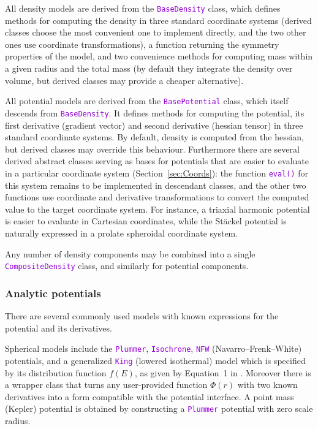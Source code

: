 \documentclass[12pt]{article}
\newcommand{\ttt}[1]{\textcolor{darkviolet}{\texttt{#1}}}
\begin{document}
All density models are derived from the \ttt{BaseDensity} class, which defines methods for computing the density in three standard coordinate systems (derived classes choose the most convenient one to implement directly, and the two other ones use coordinate transformations), a function returning the symmetry properties of the model, and two convenience methods for computing mass within a given radius and the total mass (by default they integrate the density over volume, but derived classes may provide a cheaper alternative).

All potential models are derived from the \ttt{BasePotential} class, which itself descends from \ttt{BaseDensity}. It defines methods for computing the potential, its first derivative (gradient vector) and second derivative (hessian tensor) in three standard coordinate systems. By default, density is computed from the hessian, but derived classes may override this behaviour.
Furthermore there are several derived abstract classes serving as bases for potentials that are easier to evaluate in a particular coordinate system (Section~\ref{sec:Coords}): the function \ttt{eval()} for this system remains to be implemented in descendant classes, and the other two functions use coordinate and derivative transformations to convert the computed value to the target coordinate system.
For instance, a triaxial harmonic potential is easier to evaluate in Cartesian coordinates, while the St\"ackel potential is naturally expressed in a prolate spheroidal coordinate system.

Any number of density components may be combined into a single \ttt{CompositeDensity} class, and similarly for potential components.


\subsubsection{Analytic potentials}  \label{sec:PotentialAnalytic}

There are several commonly used models with known expressions for the potential and its derivatives. 

Spherical models include the \ttt{Plummer}, \ttt{Isochrone}, \ttt{NFW} (Navarro--Frenk--White) potentials, and a generalized \ttt{King} (lowered isothermal) model which is specified by its distribution function $f(E)$, as given by Equation~1 in \cite{GielesZocchi2015}.
Moreover there is a wrapper class that turns any user-provided function $\Phi(r)$ with two known derivatives into a form compatible with the potential interface. A point mass (Kepler) potential is obtained by constructing a \ttt{Plummer} potential with zero scale radius.
\end{document}
